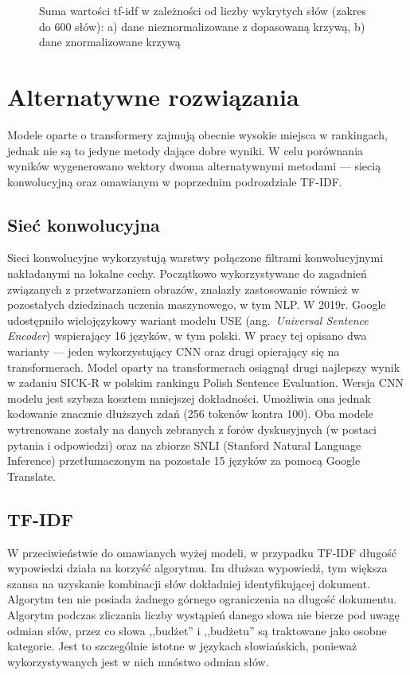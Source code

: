 \begin{figure}[htb]
\begin{minipage}{.5\textwidth}
			\end{minipage}
			\caption[Suma wartości tf-idf w zależności od liczby wykrytych słów]{Suma wartości tf-idf w zależności od liczby wykrytych słów (zakres do 600 słów):
				a) dane nieznormalizowane z dopasowaną krzywą, b) dane znormalizowane krzywą}\label{fig:tfidf_sent} %
		\end{figure}

\section{Alternatywne rozwiązania}
	Modele oparte o transformery zajmują obecnie wysokie miejsca w rankingach\cite{KLEJ,sentence_eval}, jednak nie są to jedyne metody dające dobre wyniki.
	W celu porównania wyników wygenerowano wektory dwoma alternatywnymi metodami --- siecią konwolucyjną oraz omawianym w poprzednim podrozdziale TF-IDF\@.

	\subsection{Sieć konwolucyjna}
		Sieci konwolucyjne wykorzystują warstwy połączone filtrami konwolucyjnymi nakładanymi na lokalne cechy.
		Początkowo wykorzystywane do zagadnień związanych z przetwarzaniem obrazów,
			znalazły zastosowanie również w pozostałych dziedzinach uczenia maszynowego, w tym NLP\cite{CNN_NLP}.
		W 2019r. Google udostępniło wielojęzykowy wariant modelu USE (ang.\ \emph{Universal Sentence Encoder})\cite{use_multilingual} wspierający 16 języków, w tym polski.
		W pracy tej opisano dwa warianty --- jeden wykorzystujący CNN oraz drugi opierający się na transformerach.
		Model oparty na transformerach osiągnął drugi najlepszy wynik w zadaniu SICK-R w polskim rankingu Polish Sentence Evaluation\cite{sentence_eval}.
		Wersja CNN modelu jest szybsza kosztem mniejszej dokładności.
		Umożliwia ona jednak kodowanie znacznie dłuższych zdań (256 tokenów kontra 100).
		Oba modele wytrenowane zostały na danych zebranych z forów dyskusyjnych (w postaci pytania i odpowiedzi)
			oraz na zbiorze SNLI\cite{SNLI} (Stanford Natural Language Inference) przetłumaczonym na pozostałe 15 języków za pomocą Google Translate.

	\subsection{TF-IDF}\label{sec:tfidf_vectors}
		W przeciwieństwie do omawianych wyżej modeli, w przypadku TF-IDF długość wypowiedzi działa na korzyść algorytmu.
		Im dłuższa wypowiedź, tym większa szansa na uzyskanie kombinacji słów dokładniej identyfikującej dokument.
		Algorytm ten nie posiada żadnego górnego ograniczenia na długość dokumentu.
		Algorytm podczas zliczania liczby wystąpień danego słowa nie bierze pod uwagę odmian słów,
			przez co słowa ,,budżet'' i ,,budżetu'' są traktowane jako osobne kategorie.
		Jest to szczególnie istotne w językach słowiańskich, ponieważ wykorzystywanych jest w nich mnóstwo odmian słów.
		
